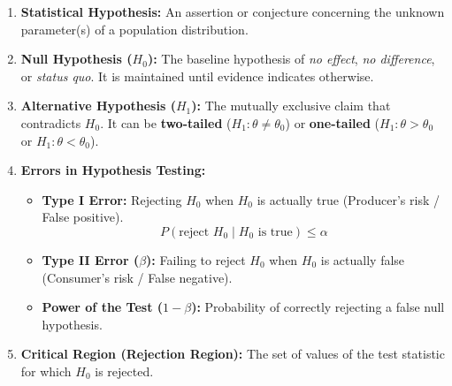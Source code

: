 \documentclass[12pt,a4paper]{article}
\begin{document}
\begin{tcolorbox}[defbox, title={\textbf{Definition: Terminology of Statistical Testing}}]
\begin{enumerate}[leftmargin=*, itemsep=2pt, topsep=2pt]
  \item \textbf{Statistical Hypothesis:} An assertion or conjecture concerning the unknown parameter(s) of a population distribution.
  \item \textbf{Null Hypothesis ($H_0$):} The baseline hypothesis of \textit{no effect}, \textit{no difference}, or \textit{status quo}. It is maintained until evidence indicates otherwise.
  \item \textbf{Alternative Hypothesis ($H_1$):} The mutually exclusive claim that contradicts $H_0$. It can be \textbf{two-tailed} ($H_1: \theta \ne \theta_0$) or \textbf{one-tailed} ($H_1: \theta > \theta_0$ or $H_1: \theta < \theta_0$).
  \item \textbf{Errors in Hypothesis Testing:}
  \begin{itemize}[leftmargin=*, itemsep=1pt]
    \item \textbf{Type I Error:} Rejecting $H_0$ when $H_0$ is actually true (Producer's risk / False positive).
    \begin{equation}
      P(\text{reject } H_0 \mid H_0 \text{ is true}) \le \alpha
    \end{equation}
    \item \textbf{Type II Error ($\beta$):} Failing to reject $H_0$ when $H_0$ is actually false (Consumer's risk / False negative).
    \item \textbf{Power of the Test ($1 - \beta$):} Probability of correctly rejecting a false null hypothesis.
  \end{itemize}
  \item \textbf{Critical Region (Rejection Region):} The set of values of the test statistic for which $H_0$ is rejected.
\end{enumerate}
\end{tcolorbox}
\end{document}
